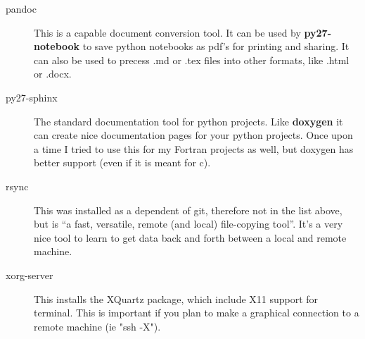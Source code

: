\documentclass[11pt]{article}
\begin{document}
\begin{description}
	\item[pandoc] This is a capable document conversion tool. It can be used by {\bf py27-notebook} to save python notebooks as pdf's for printing and sharing. It can also be used to precess .md or .tex files into other formats, like .html or .docx.
	\item[py27-sphinx] The standard documentation tool for python projects. Like {\bf doxygen} it can create nice documentation pages for your python projects. Once upon a time I tried to use this for my Fortran projects as well, but doxygen has better support (even if it is meant for c).
	\item[rsync] This was installed as a dependent of git, therefore not in the list above, but is ``a fast, versatile, remote (and local) file-copying tool''. It's a very nice tool to learn to get data back and forth between a local and remote machine.
	\item[xorg-server] This installs the XQuartz package, which include X11 support for terminal. This is important if you plan to make a graphical connection to a remote machine (ie "ssh -X"). 
\end{description}

%
%
\end{document}
